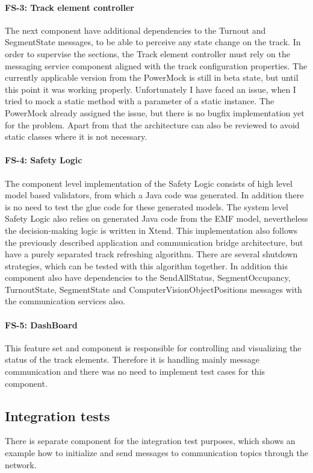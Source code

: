 \paragraph{FS-3: Track element controller} The next component have additional dependencies to the Turnout and SegmentState messages, to be able to perceive any state change on the track. In order to supervise the sections, the Track element controller must rely on the messaging service component aligned with the track configuration properties. The currently applicable version from the PowerMock is still in beta state, but until this point it was working properly. Unfortunately I have faced an issue, when I tried to mock a static method with a parameter of a static instance. The PowerMock already assigned the issue, but there is no bugfix implementation yet for the problem. Apart from that the architecture can also be reviewed to avoid static classes where it is not necessary.

\paragraph{FS-4: Safety Logic} The component level implementation of the Safety Logic consists of high level model based validators, from which a Java code was generated. In addition there is no need to test the glue code for these generated models. The system level Safety Logic also relies on generated Java code from the EMF model, nevertheless the decision-making logic is written in Xtend. This implementation also follows the previously described application and communication bridge architecture, but have a purely separated track refreshing algorithm. There are several shutdown strategies, which can be tested with this algorithm together. In addition this component also have dependencies to the SendAllStatus, SegmentOccupancy, TurnoutState, SegmentState and ComputerVisionObjectPositions messages with the communication services also.

\paragraph{FS-5: DashBoard} This feature set and component is responsible for controlling and visualizing the status of the track elements. Therefore it is handling mainly message communication and there was no need to implement test cases for this component.

\subsection{Integration tests}
There is separate component for the integration test purposes, which shows an example how to initialize and send messages to communication topics through the network. 

